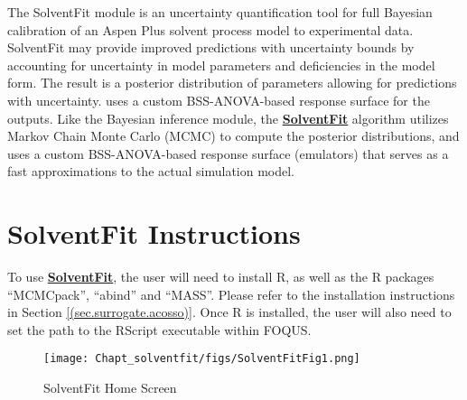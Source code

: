 \label{sec:solvent_fit}

The SolventFit module is an uncertainty quantification tool for full Bayesian calibration of an Aspen
Plus solvent process model to experimental data. SolventFit
may provide improved predictions with uncertainty bounds by accounting for uncertainty in model parameters
and deficiencies in the model form. The result is a posterior
distribution of parameters allowing for predictions with uncertainty.
uses a custom BSS-ANOVA-based response
surface for the outputs. Like the Bayesian inference module, the \textbf{\underline{SolventFit}}
algorithm \citep{Bhat_2015} utilizes Markov Chain Monte Carlo
(MCMC) to compute the posterior distributions, and uses a custom BSS-ANOVA-based response
surface (emulators) that serves as a fast approximations to the actual simulation model.

\section{SolventFit Instructions}

To use \textbf{\underline{SolventFit}}, the user will need to install R, as well as the R
packages ``MCMCpack'', ``abind'' and ``MASS''. Please refer to the
installation instructions in Section \ref{(sec.surrogate.acosso)}. 
Once R is installed, the user will also need to set the path to the RScript
executable within FOQUS. 


\begin{figure}[h!]
\centering \texttt{[image: Chapt\_solventfit/figs/SolventFitFig1.png]}
\caption{SolventFit Home Screen}
\label{fig:SolventFit_Fig_1}
\end{figure}

